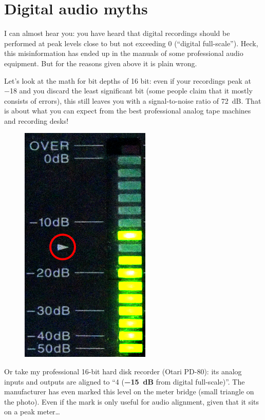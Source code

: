 \section{Digital audio myths}
\label{sec:digital_audio_myths}

I can almost hear you: you have heard that digital recordings should
be performed at peak levels close to but not exceeding \SI{0}{\dBFS}
(``digital full-scale'').  Heck, this misinformation has ended up in
the manuals of some professional audio equipment.  But for the reasons
given above it is plain wrong.

Let's look at the math for bit depths of 16 bit: even if your
recordings peak at \SI{-18}{\dBFS} and you discard the least
significant bit (some people claim that it mostly consists of errors),
this still leaves you with a signal-to-noise ratio of \SI{72}{\dB}.
That is about what you can expect from the best professional analog
tape machines and recording desks!

\begin{figure}
  \includegraphics[scale=0.24,clip]{include/images/otari_meter.png}
\end{figure}

Or take my professional 16-bit hard disk recorder (Otari PD-80): its
analog inputs and outputs are aligned to ``\SI[addsign=all]{+4}{\dBu}
(\textbf{\SI{-15}{\dB}} from digital full-scale)''.  The manufacturer
has even marked this level on the meter bridge (small triangle on the
photo).  Even if the mark is only useful for audio alignment, given
that it sits on a peak meter\ldots

